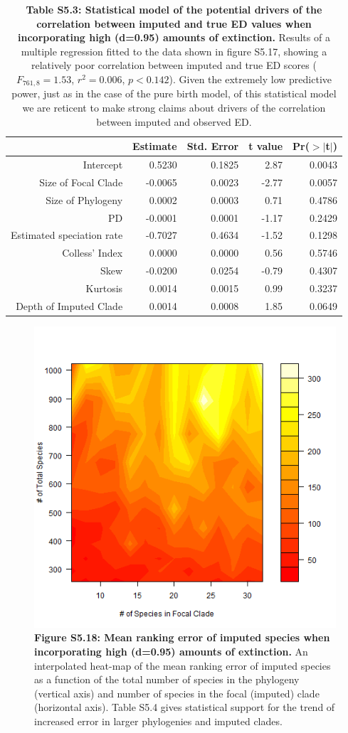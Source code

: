 \documentclass[10pt,english]{article}
\begin{document}
\begin{table}[ht]
  \centering
  \begin{tabular}{rrrrr}
    \hline
    & Estimate & Std. Error & t value & Pr($>$$|$t$|$) \\
    \hline
    Intercept & 0.5230 & 0.1825 & 2.87 & 0.0043 \\
    Size of Focal Clade & -0.0065 & 0.0023 & -2.77 & 0.0057 \\
    Size of Phylogeny & 0.0002 & 0.0003 & 0.71 & 0.4786 \\
    PD & -0.0001 & 0.0001 & -1.17 & 0.2429 \\
    Estimated speciation rate & -0.7027 & 0.4634 & -1.52 & 0.1298 \\
    Colless' Index & 0.0000 & 0.0000 & 0.56 & 0.5746 \\
    Skew & -0.0200 & 0.0254 & -0.79 & 0.4307 \\
    Kurtosis & 0.0014 & 0.0015 & 0.99 & 0.3237 \\
    Depth of Imputed Clade & 0.0014 & 0.0008 & 1.85 & 0.0649 \\
    \hline
\end{tabular}
\caption{\textbf{Table S5.3: Statistical model of the potential drivers of the
    correlation between imputed and true ED values when incorporating high
    (d=0.95) amounts of extinction.} Results of a multiple regression fitted to
    the data shown in figure S5.17, showing a relatively poor correlation
    between imputed and true ED scores ($F_{761,8} = 1.53$, $r^{2} = 0.006$, $p
    < 0.142$). Given the extremely low predictive power, just as in the case of
    the pure birth model, of this statistical model we are reticent to make
    strong claims about drivers of the correlation between imputed and observed
    ED.}
\end{table}

\begin{figure}[!ht]
  \center
  \includegraphics[width=.5\textwidth]{../figures/rankingErrorHighExtinction.png}
  \caption{\textbf{Figure S5.18: Mean ranking error of imputed species when
  incorporating high (d=0.95) amounts of extinction.} An interpolated heat-map of
  the mean ranking error of imputed species as a function of the total number of
  species in the phylogeny (vertical axis) and number of species in the focal
  (imputed) clade (horizontal axis). Table S5.4 gives statistical support for
  the trend of increased error in larger phylogenies and imputed clades.}
\end{figure}
\end{document}

